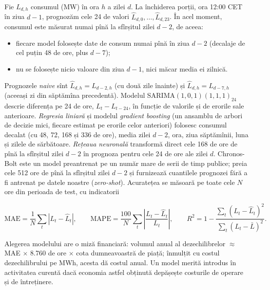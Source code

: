 {Fie $L_{d,h}$ consumul (MW) în ora $h$ a zilei $d$. La închiderea porții, ora 12:00 CET în ziua $d-1$, prognozăm cele 24 de valori $\hat L_{d,0},\dots,\hat L_{d,23}$. În acel moment, consumul este măsurat numai pînă la sfîrșitul zilei $d-2$, de aceea:
\begin{itemize}\setlength{\itemsep}{0pt}
\item fiecare model folosește date de consum numai pînă în ziua $d-2$ (decalaje de cel puțin 48 de ore, plus $d-7$);
\item nu se folosește nicio valoare din ziua $d-1$, nici măcar media ei zilnică.
\end{itemize}
Prognozele \emph{naive} sînt $\hat L_{d,h}=L_{d-2,h}$ (cu două zile înainte) și $\hat L_{d,h}=L_{d-7,h}$ (aceeași zi din săptămîna precedentă).
Modelul SARIMA$(1,0,1)(1,1,1)_{24}$ descrie diferența pe 24 de ore, $L_t-L_{t-24}$, în funcție de valorile și de erorile sale anterioare.
\emph{Regresia liniară} și modelul \emph{gradient boosting} (un ansamblu de arbori de decizie mici, fiecare estimat pe erorile celor anteriori) folosesc consumul decalat (cu 48, 72, 168 și 336 de ore), media zilei $d-2$, ora, ziua săptămînii, luna și zilele de sărbătoare.
\emph{Rețeaua neuronală} transformă direct cele 168 de ore de pînă la sfîrșitul zilei $d-2$ în prognoza pentru cele 24 de ore ale zilei $d$.
Chronos-Bolt este un model preantrenat pe un număr mare de serii de timp publice; preia cele 512 ore de pînă la sfîrșitul zilei $d-2$ și furnizează cuantilele prognozei fără a fi antrenat pe datele noastre (\emph{zero-shot}).
Acuratețea se măsoară pe toate cele $N$ ore din perioada de test, cu indicatorii}
\[
\text{MAE}=\frac1N\sum_{t}|L_t-\hat L_t|,\qquad \text{MAPE}=\frac{100}{N}\sum_t\left|\frac{L_t-\hat L_t}{L_t}\right|,\qquad R^2=1-\frac{\sum_t(L_t-\hat L_t)^2}{\sum_t(L_t-\bar L)^2}.
\]
\begin{decision}
%
{Alegerea modelului are o miză financiară: volumul anual al dezechilibrelor $\approx$ MAE $\times$ 8.760 de ore $\times$ cota dumneavoastră de piață; înmulțit cu costul dezechilibrului pe MWh, acesta dă costul anual. Un model merită introdus în activitatea curentă dacă economia astfel obținută depășește costurile de operare și de întreținere.}
\end{decision}

